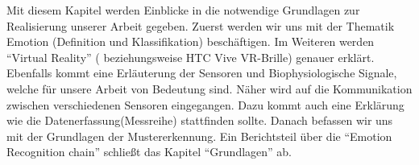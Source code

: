 
Mit diesem Kapitel werden Einblicke in die notwendige Grundlagen zur Realisierung unserer Arbeit gegeben. 
Zuerst werden wir uns mit der Thematik Emotion (Definition und Klassifikation) beschäftigen. 
Im Weiteren werden ``Virtual Reality'' ( beziehungsweise HTC Vive VR-Brille) genauer erklärt. 
Ebenfalls kommt eine Erläuterung der Sensoren und Biophysiologische Signale, welche f{\"u}r unsere Arbeit von Bedeutung sind. 
Näher wird auf die Kommunikation zwischen verschiedenen Sensoren eingegangen.
Dazu kommt auch eine Erklärung wie die Datenerfassung(Messreihe) stattfinden sollte.
Danach befassen wir uns mit der Grundlagen der Mustererkennung. 
Ein Berichtsteil {\"u}ber die ``Emotion Recognition chain'' schlie{\ss}t das Kapitel ``Grundlagen'' ab.












